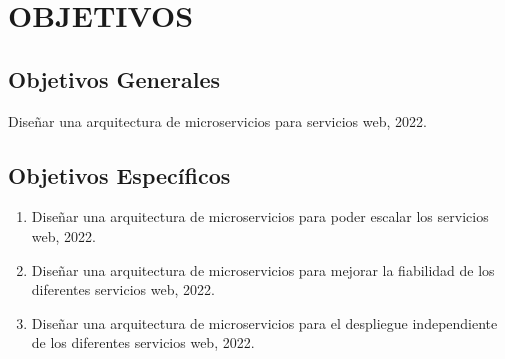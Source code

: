 \section{OBJETIVOS}

%
%
%
%


\subsection{Objetivos Generales}

Diseñar una arquitectura de microservicios para servicios web, 2022.

\subsection{Objetivos Específicos}

\begin{enumerate}
  \item Diseñar una arquitectura de microservicios para poder escalar los servicios web, 2022.
  \item Diseñar una arquitectura de microservicios para mejorar la fiabilidad de los diferentes servicios web, 2022.
  \item Diseñar una arquitectura de microservicios para el despliegue independiente de los diferentes servicios web, 2022.
\end{enumerate}
